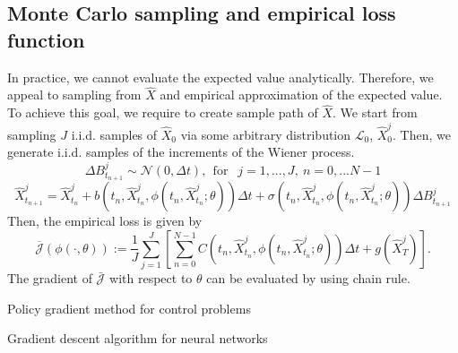 \documentclass[11pt]{book}
\begin{document}
\subsection{Monte Carlo sampling and empirical loss function}
In practice, we cannot evaluate the expected value analytically. Therefore, we appeal to sampling from $\hat{X}$ and empirical approximation of the expected value. To achieve this goal, we require to create sample path of $\hat{X}$. We start from sampling $J$ i.i.d. samples of $\hat{X}_0$ via some arbitrary distribution $\mathcal{L}_0$, $\hat{X}_0^j$. Then, we generate i.i.d. samples of the increments of the Wiener process. 
\[
\Delta B_{t_{n+1}}^j\sim\mathcal{N}(0,\Delta t),~~\text{for }~~j=1,...,J,~n=0,...N-1
\]
\begin{equation}\label{eqn:discrete_euler}
\hat{X}^j_{t_{n+1}} = \hat{X}^j_{t_{n}} + b(t_{n},\hat{X}^j_{t_{n}},\phi(t_{n},\hat{X}^j_{t_{n}};\theta)) \Delta t+\sigma(t_{n},\hat{X}^j_{t_{n}},\phi(t_{n},\hat{X}^j_{t_{n}};\theta))\Delta B_{t_{n+1}}^j    
\end{equation}
Then, the empirical loss is given by
\begin{equation}\label{func:loss_empirical}
\overline{\mathcal{J}}(\phi(\cdot,\theta)):=\frac{1}{J}\sum_{j=1}^{J}\left[\sum_{n=0}^{N-1} C(t_{n},\hat{X}^j_{t_n},\phi(t_{n},\hat{X}^j_{t_{n}};\theta))\Delta t+g(\hat{X}^j_T)\right].
\end{equation}
The gradient of $\bar{\mathcal{J}}$ with respect to $\theta$ can be evaluated by using chain rule.
\begin{algorithm}
        \caption{Policy gradient method for control problems}
        \label{alg:pgm}
        \caption{Gradient descent algorithm for neural networks}
\end{algorithm}
\end{document}
